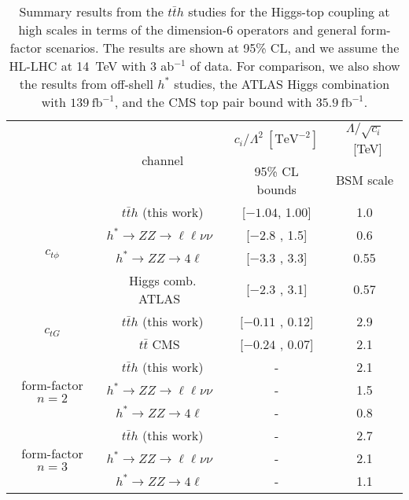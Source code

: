 \documentclass[reprint, aps,prd, preprintnumbers,groupedaddress,nofootinbib]{revtex4-1}
\begin{document}
\begin{table*}[t!]
\centering
\begin{tabular}{|c|c|c|c|}
\hline
\multirow{2}{*}{} & \multirow{2}{*}{channel} & $c_i/\Lambda^2~[\text{TeV}^{-2}]$    & $\Lambda/\sqrt{c_i}$~[TeV]   \\
                  &                          &  95\% CL bounds                      &   BSM scale   \\
\hline
\multirow{4}{*}{$c_{t\phi}$} & $t\bar{t}h$  (this work)                                           &  [$-1.04$, 1.00]    &  1.0  \\
                   & $h^* \to ZZ \to\ell\ell\nu\nu$~\cite{Goncalves:2020vyn}    &  [$-2.8$ , 1.5]     &  0.6  \\
                   & $h^* \to ZZ \to 4\ell$~\cite{Goncalves:2018pkt}            &  [$-3.3$ , 3.3]     &  0.55  \\
                     &Higgs comb. ATLAS~\cite{ATLAS-CONF-2020-027}                   &  [$-2.3$ , 3.1]      &  0.57  \\
\hline
\multirow{2}{*}{$c_{tG}$} &  $t\bar{t}h$    (this work)  &  $[-0.11$ , 0.12] &   2.9    \\
                          & $t\bar{t}$ CMS~\cite{CMS:2018jcg}       &  [$-0.24$ , 0.07] &   2.1   \\
\hline
\multirow{3}{*}{form-factor $n=2$} & $t\bar{t}h$             (this work)                                       &  -   &   2.1  \\
                                   & $h^* \to ZZ \to\ell\ell\nu\nu$~\cite{Goncalves:2020vyn}    &  -   &   1.5  \\
                                   & $h^* \to ZZ \to 4\ell$~\cite{Goncalves:2018pkt}            &  -   &   0.8  \\
\hline                    
\multirow{3}{*}{form-factor $n=3$} & $t\bar{t}h$                                    (this work)    &  -  &   2.7  \\
                                   & $h^* \to ZZ \to\ell\ell\nu\nu$~\cite{Goncalves:2020vyn}    &  -   &   2.1  \\
                                   & $h^* \to ZZ \to 4\ell$~\cite{Goncalves:2018pkt}            &  -  &   1.1  \\
\hline
\end{tabular}
\caption{Summary results from the $t\bar t h$ studies for the Higgs-top coupling at high scales in terms of the dimension-6 operators and general form-factor scenarios. The results are shown at 95\% CL, and we assume the HL-LHC at 14~TeV with 3 ab$^{-1}$ of data. For comparison, we also show the results from off-shell $h^*$ studies, the ATLAS Higgs combination with $139~\text{fb}^{-1}$, and the CMS top pair bound with $35.9~\text{fb}^{-1}$.}
\label{tab:summary}
\end{table*}
\end{document}
